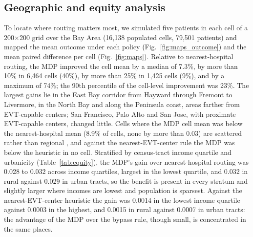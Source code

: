 \subsection{Geographic and equity analysis}
To locate where routing matters most, we simulated five patients in each cell of a 200$\times$200 grid over the Bay Area (16,138 populated cells, 79,501 patients) and mapped the mean outcome under each policy (Fig.~\ref{fig:maps_outcome}) and the mean paired difference per cell (Fig.~\ref{fig:maps}). Relative to nearest-hospital routing, the MDP improved the cell mean by a median of 7.3\%, by more than 10\% in 6,464 cells (40\%), by more than 25\% in 1,425 cells (9\%), and by a maximum of 74\%; the 90th percentile of the cell-level improvement was 23\%. The largest gains lie in the East Bay corridor from Hayward through Fremont to Livermore, in the North Bay and along the Peninsula coast, areas farther from EVT-capable centers; San Francisco, Palo Alto and San Jose, with proximate EVT-capable centers, changed little. Cells where the MDP cell mean was below the nearest-hospital mean (8.9\% of cells, none by more than 0.03) are scattered rather than regional , and against the nearest-EVT-center rule the MDP was below the heuristic in no cell. Stratified by census-tract income quartile and urbanicity (Table~\ref{tab:equity}), the MDP's gain over nearest-hospital routing was 0.028 to 0.032 across income quartiles, largest in the lowest quartile, and 0.032 in rural against 0.029 in urban tracts, so the benefit is present in every stratum and slightly larger where incomes are lowest and population is sparsest. Against the nearest-EVT-center heuristic the gain was 0.0014 in the lowest income quartile against 0.0003 in the highest, and 0.0015 in rural against 0.0007 in urban tracts: the advantage of the MDP over the bypass rule, though small, is concentrated in the same places.

